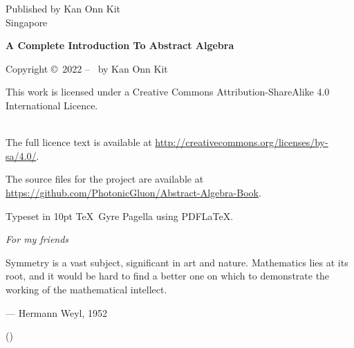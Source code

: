 \newpage{}

\clearpage\null\vfill
\thispagestyle{empty}
\begin{minipage}[b]{0.9\textwidth}
    \footnotesize\raggedright
    \setlength{\parskip}{0.5\baselineskip}

    Published by Kan Onn Kit\\
    Singapore
    \vspace{5cm}

    \textbf{A Complete Introduction To Abstract Algebra}\par
    \editiontext
    \vspace{0.3cm}

    Copyright \copyright \ 2022 -- \the\year\ by Kan Onn Kit\par
    This work is licensed under a
    Creative Commons Attribution-ShareAlike 4.0 International Licence.\par
    \\
    The full licence text is available at \url{http://creativecommons.org/licenses/by-sa/4.0/}.\par
    The source files for the project are available at \url{https://github.com/PhotonicGluon/Abstract-Algebra-Book}.
    \vspace{0.3cm}

    Typeset in 10pt \TeX~Gyre Pagella using PDF\LaTeX.
\end{minipage}

\vspace*{2\baselineskip}
\cleardoublepage

\thispagestyle{empty}
\vspace*{1cm}

\begin{center}
    {\fontsize{18pt}{0}\selectfont \textit{For my friends}}\\
\end{center}

\vspace*{1.5cm}

\begin{center}
    \Large{\parbox{10cm}{
        \begin{raggedright}
            \Large
            Symmetry is a vast subject, significant in art and nature. Mathematics lies at its root, and it would be hard to find a better one on which to demonstrate the working of the mathematical intellect.
            \vspace{0.3cm}

            \hfill
            --- Hermann Weyl, 1952\\
            \vspace{-0.25cm}

            \hfill
            \normalsize
            ({\cite[p.~145]{weyl_1952}})
        \end{raggedright}
    }
}
\end{center}

